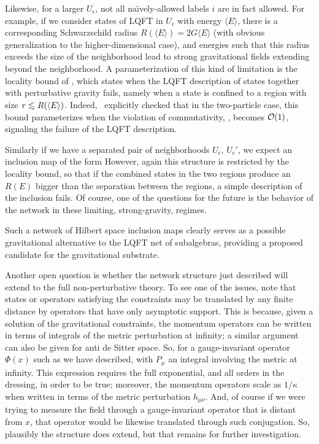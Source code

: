 Likewise, for a larger $U_\epsilon$, not all na\"\i vely-allowed labels $i$ are in fact allowed.  For example, if we consider states of LQFT in $U_\epsilon$ with energy $\langle E\rangle$, there is a corresponding Schwarzschild radius $R(\langle E\rangle)=2G\langle E\rangle$ (with obvious generalization to the higher-dimensional case), and energies such that this radius exceeds the size of the neighborhood lead to strong gravitational fields extending beyond the neighborhood.    A parameterization of this kind of limitation is the locality bound of , which states when the LQFT description of states together with perturbative gravity fails, namely when a state is confined to a region with size $r\roughly<R(\langle E\rangle)$.  Indeed, \DoGione\ explicitly checked that in the two-particle case, this bound parameterizes when the violation of commutativity, \phicom, becomes ${\cal O}(1)$, signaling the failure of the LQFT description. 

Similarly if we have a separated pair of neighborhoods $U_\epsilon$, $U_\epsilon'$, we expect an inclusion map of the form
%
\eqn{}
%
However, again this structure is restricted by the locality bound, so that if the combined states in the two regions produce an $R(E)$ bigger than the separation between the regions, a simple description of the inclusion fails.  Of course, one of the questions for the future is the behavior of the network in these limiting, strong-gravity, regimes.

Such a network of Hilbert space inclusion maps clearly serves as a possible gravitational alternative to the LQFT net of subalgebras, providing a proposed candidate for the gravitational substrate.

Another open question is whether the network structure just described will extend to the full non-perturbative theory.  To see one of the issues, note that states or operators satisfying the constraints may be translated by any finite distance by operators that have only asymptotic support.  This is because, given a solution of the gravitational constraints, the momentum operators can be written in terms of integrals of the metric perturbation at infinity; a similar argument can also be given for anti de Sitter space.  So, for a gauge-invariant operator $\Phi(x)$ such as we have described, 
%
\eqn{}
%
with $P_\mu$ an integral involving the metric at infinity.
This expression requires the full exponential, and all orders in the dressing, in order to be true\DoGithree; moreover, the momentum operators scale as $1/\kappa$ when written in terms of the metric perturbation $h_{\mu\nu}$.  And, of course if we were trying to measure the field through a gauge-invariant operator that is distant from $x$, that operator would be likewise translated through such conjugation.  So, plausibly the structure does extend, but that remains for further investigation.


